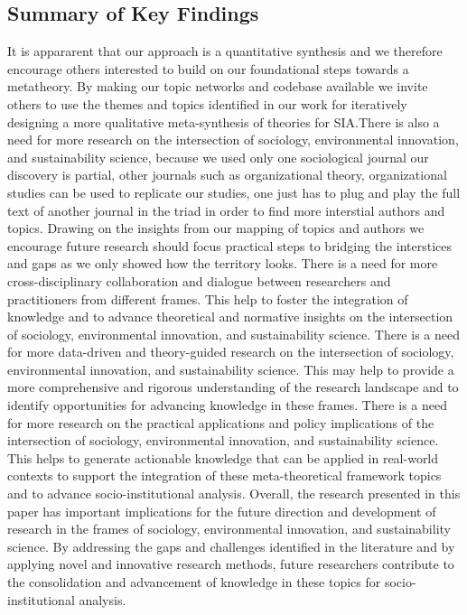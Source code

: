 \documentclass[12pt]{article}
\begin{document}
\subsection{Summary of Key Findings}
It is appararent that our approach is a quantitative synthesis and we therefore encourage others interested to build on our foundational steps towards a metatheory. By making our topic networks and codebase available we invite others to use the themes and topics identified in our work for iteratively designing a more qualitative meta-synthesis of theories for SIA.There is also a need for more research on the intersection of sociology, environmental innovation, and sustainability science, because we used only one sociological journal our discovery is partial, other journals such as organizational theory, organizational studies can be used to replicate our studies, one just has to plug and play the full text of another journal in the triad in order to find more interstial authors and topics. Drawing on the insights from our mapping of topics and authors we encourage future research should focus practical steps to bridging the interstices and  gaps as we only showed how the territory looks. There is a need for more cross-disciplinary collaboration and dialogue between researchers and practitioners from different frames. This  help to foster the integration of knowledge and to advance theoretical and normative insights on the intersection of sociology, environmental innovation, and sustainability science. There is a need for more data-driven and theory-guided research on the intersection of sociology, environmental innovation, and sustainability science. This may help to provide a more comprehensive and rigorous understanding of the research landscape and to identify opportunities for advancing knowledge in these frames.
There is a need for more research on the practical applications and policy implications of the intersection of sociology, environmental innovation, and sustainability science. This  helps to generate actionable knowledge that can be applied in real-world contexts to support the integration of these meta-theoretical framework topics and to advance socio-institutional analysis.
Overall, the research presented in this paper has important implications for the future direction and development of research in the frames of sociology, environmental innovation, and sustainability science. By addressing the gaps and challenges identified in the literature and by applying novel and innovative research methods, future researchers  contribute to the consolidation and advancement of knowledge in these topics for socio-institutional analysis.
\end{document}
